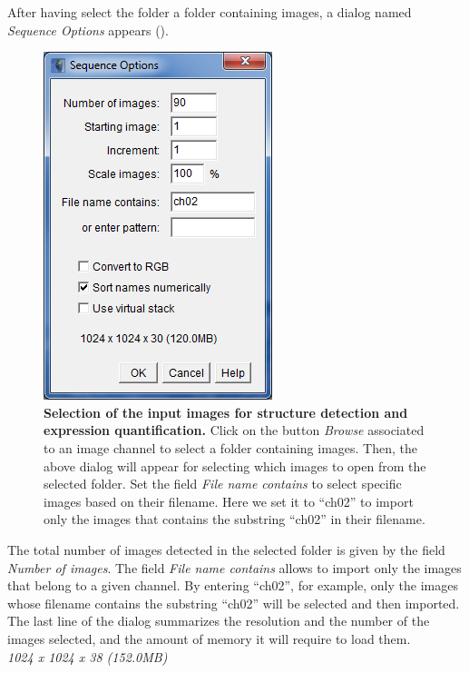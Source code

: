 After having select the folder a folder containing images, a dialog named \textit{Sequence Options} appears ().\\

\begin{figure}[!h]
\centering
\includegraphics[scale=0.7]{images/wingj_import_stack.jpg}
\caption{\textbf{Selection of the input images for structure detection and expression quantification.} Click on the button \textit{Browse} associated to an image channel to select a folder containing images. Then, the above dialog will appear for selecting which images to open from the selected folder. Set the field \textit{File name contains} to select specific images based on their filename. Here we set it to ``ch02'' to import only the images that contains the substring ``ch02'' in their filename.}
\label{fig:wingj_import_stack}
\end{figure}

The total number of images detected in the selected folder is given by the field \textit{Number of images}. The field \textit{File name contains} allows to import only the images that belong to a given channel. By entering ``ch02'', for example, only the images whose filename contains the substring ``ch02'' will be selected and then imported. The last line of the dialog summarizes the resolution and the number of the images selected, and the amount of memory it will require to load them.\\

\textit{1024 x 1024 x 38 (152.0MB)}\\


